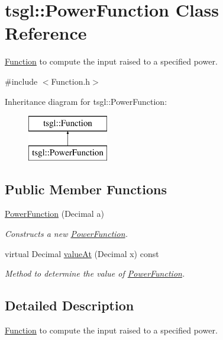 \hypertarget{classtsgl_1_1_power_function}{}\section{tsgl\+:\+:Power\+Function Class Reference}
\label{classtsgl_1_1_power_function}


\hyperlink{classtsgl_1_1_function}{Function} to compute the input raised to a specified power.  




{\ttfamily \#include $<$Function.\+h$>$}

Inheritance diagram for tsgl\+:\+:Power\+Function\+:\begin{figure}[H]
\begin{center}
\leavevmode
\includegraphics[height=2.000000cm]{classtsgl_1_1_power_function}
\end{center}
\end{figure}
\subsection*{Public Member Functions}
\begin{DoxyCompactItemize}
\item 
\hyperlink{classtsgl_1_1_power_function_a0a5d692e9bc9cf2a176ecab4ffc06519}{Power\+Function} (Decimal a)
\begin{DoxyCompactList}\small\item\em Constructs a new \hyperlink{classtsgl_1_1_power_function}{Power\+Function}. \end{DoxyCompactList}\item 
virtual Decimal \hyperlink{classtsgl_1_1_power_function_a1dfcce604dd60b033969807f6312b074}{value\+At} (Decimal x) const
\begin{DoxyCompactList}\small\item\em Method to determine the value of \hyperlink{classtsgl_1_1_power_function}{Power\+Function}. \end{DoxyCompactList}\end{DoxyCompactItemize}


\subsection{Detailed Description}
\hyperlink{classtsgl_1_1_function}{Function} to compute the input raised to a specified power. 

